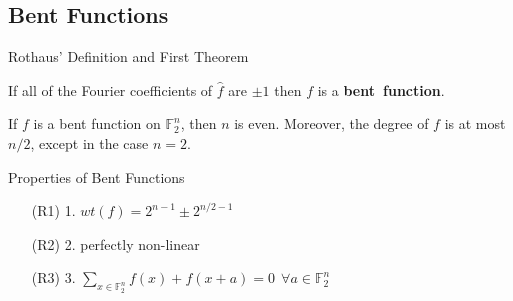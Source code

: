 \documentclass{beamer}
\def\gftwo{\mathbb{F}_2}
\begin{document}
\subsection{Bent Functions}
\begin{frame}{Rothaus' Definition and First Theorem}
  \begin{definition}\label{def:bent-function}
    If all of the Fourier coefficients of $\hat{f}$ are $\pm1$ then
    $f$ is a {\bf bent\ function}.
  \end{definition}
  \begin{theorem}\label{thm:deg-of-bent-function}
  	If $f$ is a bent function on $\gftwo^n$, then $n$ is even.
    Moreover, the degree of $f$ is at most $n/2$, except in the case $n=2$.
  \end{theorem}
\end{frame}

\begin{frame}{Properties of Bent Functions}
  \begin{enumerate}
      \pause
    \item[(R1) 1.] $wt(f)=2^{n-1}\pm2^{n/2-1}$
      \pause
    \item[(R2) 2.] perfectly non-linear
      \pause
    \item[(R3) 3.] $\sum_{x\in\gftwo^n}{f(x)+f(x+a)}=0 \ \ \forall a\in\gftwo^n$
  \end{enumerate}
\end{frame}
\end{document}
